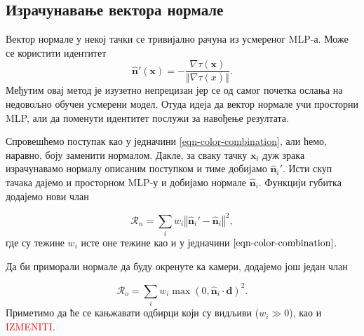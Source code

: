 \documentclass[12pt, a4paper, twoside]{book}
\numberwithin{equation}{chapter}
\numberwithin{theorem}{section}
\numberwithin{definition}{section}
\numberwithin{definitionChapter}{chapter}
\begin{document}
\subsection{Израчунавање вектора нормале}
Вектор нормале у некој тачки се тривијално рачуна из усмереног MLP-а. Може се користити идентитет
	\begin{equation}
		\hat{\textbf{n}}'(\textbf{x}) = -\frac{\nabla\tau(\textbf{x})}{\left\Vert\nabla\tau(x)\right\Vert}.
	\end{equation}
Међутим овај метод је изузетно непрецизан јер се од самог почетка ослања на недовољно обучен усмерени модел.
Отуда идеја да вектор нормале учи просторни MLP, али да поменути идентитет послужи за навођење резултата.

Спровешћемо поступак као у једначини \ref{eqn-color-combination}, али ћемо, наравно, боју заменити нормалом.
Дакле, за сваку тачку $\mathbf{x}_i$ дуж зрака израчунавамо нормалу описаним поступком и тиме добијамо $\hat{\mathbf{n}}_i'$.
Исти скуп тачака дајемо и просторном MLP-у и добијамо нормале $\hat{\mathbf{n}}_i$. Функцији губитка додајемо нови члан

	\begin{equation}
		\mathcal{R}_n = \sum_i w_i \left\Vert \hat{\mathbf{n}}_i' - \hat{\mathbf{n}}_i \right\Vert^2,
	\end{equation}
где су тежине $w_i$ исте оне тежине као и у једначини $\ref{eqn-color-combination}$.

Да би приморали нормале да буду окренуте ка камери, додајемо још један члан

	\begin{equation}
		\mathcal{R}_o = \sum_i w_i \max(0, \hat{\mathbf{n}}_i \cdot \mathbf{d})^2.
	\end{equation}
Приметимо да ће се кањжавати одбирци који су видљиви ($w_i \gg 0$), као и \textcolor{red}{IZMENITI}.
\end{document}
